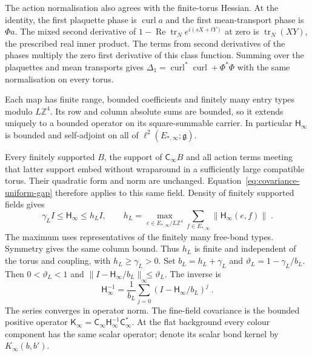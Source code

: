 \documentclass[11pt]{article}
\newcommand{\tr}{\operatorname{tr}}
\begin{document}
The action normalisation also agrees with the finite-torus Hessian. At the identity, the first plaquette phase is $\operatorname{curl}a$ and the first mean-transport phase is $\Phi a$. The mixed second derivative of $1-\operatorname{Re}\tr_N e^{i(sX+tY)}$ at zero is $\tr_N(XY)$, the prescribed real inner product. The terms from second derivatives of the phases multiply the zero first derivative of this class function. Summing over the plaquettes and mean transports gives $\Delta_1=\operatorname{curl}^*\operatorname{curl}+\Phi^*\Phi$ with the same normalisation on every torus.

Each map has finite range, bounded coefficients and finitely many entry types modulo $L\mathbb Z^4$. Its row and column absolute sums are bounded, so it extends uniquely to a bounded operator on its square-summable carrier. In particular $\mathsf H_\infty$ is bounded and self-adjoint on all of $\ell^2(E_{*,\infty};\mathfrak g)$.

Every finitely supported $B$, the support of $\mathsf C_\infty B$ and all action terms meeting that latter support embed without wraparound in a sufficiently large compatible torus. Their quadratic form and norm are unchanged. Equation~\eqref{eq:covariance-uniform-gap} therefore applies to this same field. Density of finitely supported fields gives
\begin{equation}\label{eq:bulk-uniform-gap}
    \gamma_L I\leq \mathsf H_\infty\leq h_L I,
    \qquad
    h_L=\max_{e\in E_{*,\infty}/L\mathbb Z^4}
        \sum_{f\in E_{*,\infty}}\|\mathsf H_\infty(e,f)\|\;.
\end{equation}
The maximum uses representatives of the finitely many free-bond types. Symmetry gives the same column bound. Thus $h_L$ is finite and independent of the torus and coupling, with $h_L\geq\gamma_L>0$. Set $b_L=h_L+\gamma_L$ and $\vartheta_L=1-\gamma_L/b_L$. Then $0<\vartheta_L<1$ and $\|I-\mathsf H_\infty/b_L\|\leq\vartheta_L$. The inverse is
\begin{equation}\label{eq:bulk-neumann-inverse}
    \mathsf H_\infty^{-1}
        =\frac{1}{b_L}\sum_{j=0}^{\infty}
            (I-\mathsf H_\infty/b_L)^j\;.
\end{equation}
The series converges in operator norm. The fine-field covariance is the bounded positive operator $\mathsf K_\infty=\mathsf C_\infty\mathsf H_\infty^{-1}\mathsf C_\infty^*$. At the flat background every colour component has the same scalar operator; denote its scalar bond kernel by $K_\infty(b,b')$.
\end{document}
